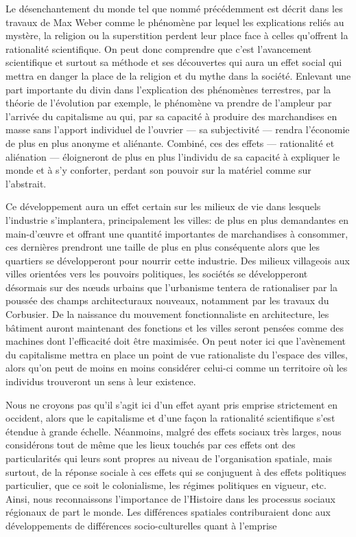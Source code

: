 Le désenchantement du monde tel que nommé précédemment est décrit dans les travaux de Max Weber comme le phénomène par lequel les explications reliés au mystère, la religion ou la superstition perdent leur place face à celles qu'offrent la rationalité scientifique. 
On peut donc comprendre que c'est l'avancement scientifique et surtout sa méthode et ses découvertes qui aura un effet social qui mettra en danger la place de la religion et du mythe dans la société. 
Enlevant une part importante du divin dans l'explication des phénomènes terrestres, par la théorie de l'évolution par exemple, le phénomène va prendre de l'ampleur par l'arrivée du capitalisme au  qui, par sa capacité à produire des marchandises en masse sans l'apport individuel de l'ouvrier --- sa subjectivité --- rendra l'économie de plus en plus anonyme et aliénante. 
Combiné, ces des effets --- rationalité et aliénation --- éloigneront de plus en plus l'individu de sa capacité à expliquer le monde et à s'y conforter, perdant son pouvoir sur la matériel comme sur l'abstrait.

Ce développement aura un effet certain sur les milieux de vie dans lesquels l'industrie s'implantera, principalement les villes: de plus en plus demandantes en main-d’œuvre et offrant une quantité importantes de marchandises à consommer, ces dernières prendront une taille de plus en plus conséquente alors que les quartiers se développeront pour nourrir cette industrie. 
Des milieux villageois aux villes orientées vers les pouvoirs politiques, les sociétés se développeront désormais sur des nœuds urbains que l'urbanisme tentera de rationaliser par la poussée des champs architecturaux nouveaux, notamment par les travaux du Corbusier. 
De la naissance du mouvement fonctionnaliste en architecture, les bâtiment auront maintenant des fonctions et les villes seront pensées comme des machines dont l'efficacité doit être maximisée\missref{}. 
On peut noter ici que l'avènement du capitalisme mettra en place un point de vue rationaliste du l'espace des villes, alors qu'on peut de moins en moins considérer celui-ci comme un territoire où les individus trouveront un sens à leur existence.

Nous ne croyons pas qu'il s'agit ici d'un effet ayant pris emprise strictement en occident, alors que le capitalisme et d'une façon la rationalité scientifique s'est étendue à grande échelle. 
Néanmoins, malgré des effets sociaux très larges, nous considérons tout de même que les lieux touchés par ces effets ont des particularités qui leurs sont propres au niveau de l'organisation spatiale, mais surtout, de la réponse sociale à ces effets qui se conjuguent à des effets politiques particulier, que ce soit le colonialisme, les régimes politiques en vigueur, etc. 
Ainsi, nous reconnaissons l'importance de l'Histoire dans les processus sociaux régionaux de part le monde. 
Les différences spatiales contriburaient donc aux développements de différences socio-culturelles quant à l'emprise 


